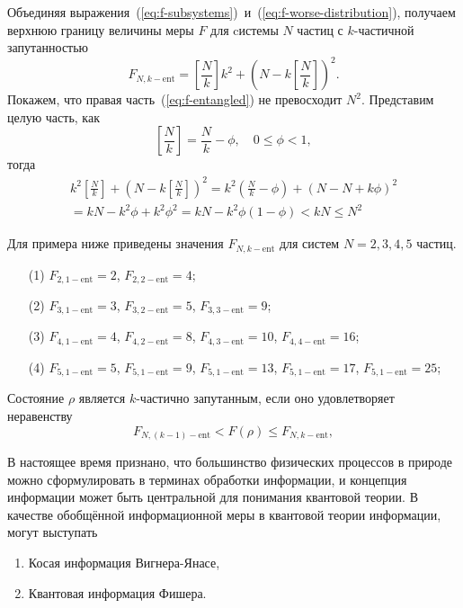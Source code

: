 Объединяя выражения~(\ref{eq:f-subsystems})~и~(\ref{eq:f-worse-distribution}),
получаем верхнюю границу величины меры $F$ для cистемы $N$ частиц с $k$-частичной запутанностью
%
\begin{equation}\label{eq:f-entangled}
  F_{N, k-\mathrm{ent}} = \left[ \frac N k \right] k^2 + \left(N - k \left[ \frac N k \right]\right)^2.
\end{equation}
%
Покажем, что правая часть~(\ref{eq:f-entangled}) не превосходит $N^2$.
Представим целую часть, как
\begin{equation}
  \left[\frac{N}{k}\right] = \frac{N}{k} -\phi,\quad 0 \leq \phi < 1,
\end{equation}
тогда
%
\begin{multline}
  k^2\left[\frac{N}{k}\right] + (N-k\left[\frac{N}{k}\right])^2
  = k^2\left(\frac{N}{k} - \phi\right) + (N - N +k\phi)^2 \\
  = kN - k^2 \phi +k^2 \phi^2 = kN - k^2 \phi(1- \phi) < kN \leq N^2
\end{multline}


Для примера ниже приведены значения $F_{N, k-\mathrm{ent}}$
для систем $N = 2, 3, 4, 5$ частиц.
\begin{itemize}
  \item[(1)]
    $F_{2, 1-\mathrm{ent}}= 2$,
    $F_{2, 2-\mathrm{ent}}= 4$;
  \item[(2)]
    $F_{3, 1-\mathrm{ent}}= 3$,
    $F_{3, 2-\mathrm{ent}}= 5$,
    $F_{3, 3-\mathrm{ent}}= 9$;
  \item[(3)]
    $F_{4, 1-\mathrm{ent}}= 4$,
    $F_{4, 2-\mathrm{ent}}= 8$,
    $F_{4, 3-\mathrm{ent}}= 10$,
    $F_{4, 4-\mathrm{ent}}= 16$;
  \item[(4)]
    $F_{5, 1-\mathrm{ent}}= 5$,
    $F_{5, 1-\mathrm{ent}}= 9$,
    $F_{5, 1-\mathrm{ent}}= 13$,
    $F_{5, 1-\mathrm{ent}}= 17$,
    $F_{5, 1-\mathrm{ent}}= 25$;
\end{itemize}


\begin{definition}
  Состояние $\rho$ является $k$-частично запутанным,
  если оно удовлетворяет неравенству
  \begin{equation}\label{eq:entanglement-criteria}
    F_{N, (k-1)-\mathrm{ent}} < F(\rho) \leq  F_{N, k-\mathrm{ent}},
  \end{equation}
\end{definition}

В настоящее время признано,
что большинство физических процессов в природе можно сформулировать в терминах обработки информации,
и концепция информации может быть центральной для понимания квантовой теории\cite{Wheeler2004, Summhammer2004, Frieden2004}.
В качестве обобщённой информационной меры в квантовой теории информации,
могут выступать
\begin{enumerate}
  \item Косая информация Вигнера-Янасе\cite{Zeqian2005},
  \item Квантовая информация Фишера\cite{Hyllus2012}.
\end{enumerate}

